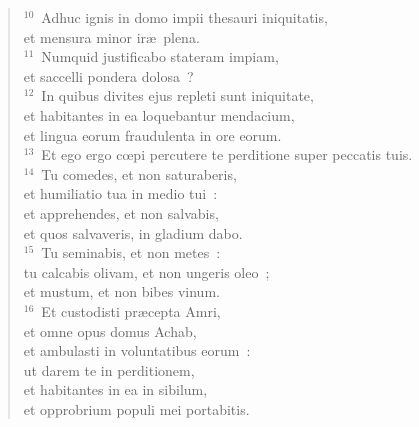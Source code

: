 \begin{flushleft}
\begin{verse}
${}^{10}$~Adhuc ignis in domo impii thesauri iniquitatis,\\ et mensura minor ir\ae\ plena.\\
${}^{11}$~Numquid justificabo stateram impiam,\\ et saccelli pondera dolosa~?\\
${}^{12}$~In quibus divites ejus repleti sunt iniquitate,\\ et habitantes in ea loquebantur mendacium,\\ et lingua eorum fraudulenta in ore eorum.\\
${}^{13}$~Et ego ergo cœpi percutere te perditione super peccatis tuis.\\
${}^{14}$~Tu comedes, et non saturaberis,\\ et humiliatio tua in medio tui~:\\ et apprehendes, et non salvabis,\\ et quos salvaveris, in gladium dabo.\\
${}^{15}$~Tu seminabis, et non metes~:\\ tu calcabis olivam, et non ungeris oleo~;\\ et mustum, et non bibes vinum.\\
${}^{16}$~Et custodisti pr\ae cepta Amri,\\ et omne opus domus Achab,\\ et ambulasti in voluntatibus eorum~:\\ ut darem te in perditionem,\\ et habitantes in ea in sibilum,\\ et opprobrium populi mei portabitis.\end{verse}\end{flushleft}


